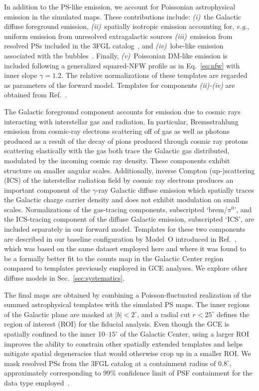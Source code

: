 \documentclass[prd,aps,10pt,nofootinbib,twocolumn,superscriptaddress,preprintnumbers,balancelastpage,longbibliography]{revtex4-1}
\begin{document}
In addition to the PS-like emission, we account for Poissonian astrophysical emission in the simulated maps.  These contributions include: \emph{(i)}~the Galactic diffuse foreground emission, \emph{(ii)}~spatially isotropic emission accounting for, \emph{e.g.}, uniform emission from unresolved extragalactic sources \emph{(iii)}~emission from resolved PSs included in the \Fermi 3FGL catalog~\cite{Fermi-LAT:2015bhf}, and \emph{(iv)}~lobe-like emission associated with the \Fermi bubbles~\cite{Su:2010qj}. Finally, \emph{(v)}~Poissonian DM-like emission is included following a generalized squared-NFW profile as in Eq.~\eqref{eq:nfw} with inner slope $\gamma=1.2$. The relative normalizations of these templates are regarded as parameters of the forward model. Templates for components \emph{(ii)-(iv)} are obtained from Ref.~\cite{rodd_nicholas_safdi_siddharth_2016}. 

The Galactic foreground component accounts for emission due to cosmic rays interacting with interstellar gas and radiation. In particular, Bremsstrahlung emission from cosmic-ray electrons scattering off of gas as well as photons produced as a result of the decay of pions produced through cosmic ray protons scattering elastically with the gas both trace the Galactic gas distributed, modulated by the incoming cosmic ray density. These components exhibit structure on smaller angular scales. Additionally, inverse Compton (up-)scattering (ICS) of the interstellar radiation field by cosmic ray electrons produces an important component of the $\gamma$-ray Galactic diffuse emission which spatially traces the Galactic charge carrier density and does not exhibit modulation on small scales. Normalizations of the gas-tracing components, subscripted `brem/$\pi^0$', and the ICS-tracing component of the diffuse Galactic emission, subscripted `ICS', are included separately in our forward model. Templates for these two components are described in our baseline configuration by {Model~O} introduced in Ref.~\cite{Buschmann:2020adf}, which was based on the same \Fermi dataset employed here and where it was found to be a formally better fit to the counts map in the Galactic Center region compared to templates previously employed in GCE analyses. We explore other diffuse models in Sec.~\ref{sec:systematics}. 

The final maps are obtained by combining a Poisson-fluctuated realization of the summed astrophysical templates with the simulated PS maps. The inner regions of the Galactic plane are masked at $|b| < 2^\circ$, and a radial cut $r < 25^\circ$ defines the region of interest (ROI) for the fiducial analysis. Even though the GCE is spatially confined to the inner 10--$15^\circ$ of the Galactic Center, using a larger ROI improves the ability to constrain other spatially extended templates and helps mitigate spatial degeneracies that would otherwise crop up in a smaller ROI. We mask resolved PSs from the 3FGL catalog at a containment radius of $0.8^\circ$, approximately corresponding to 99\% confidence limit of PSF containment for the data type employed~\cite{Fermi-LAT:2015bhf}.
\end{document}
